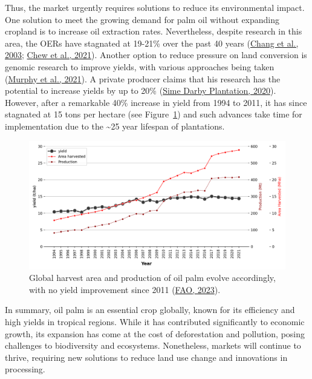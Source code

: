 \documentclass[
  letterpaper,
  DIV=11,
  numbers=noendperiod]{scrreprt}
\begin{document}
Thus, the market urgently requires solutions to reduce its environmental
impact. One solution to meet the growing demand for palm oil without
expanding cropland is to increase oil extraction rates. Nevertheless,
despite research in this area, the OERs have stagnated at 19-21\% over
the past 40 years
(\protect\hyperlink{ref-changEconomicPerspectiveOil2003}{Chang et al.,
2003}; \protect\hyperlink{ref-chewImprovingSustainabilityPalm2021}{Chew
et al., 2021}). Another option to reduce pressure on land conversion is
genomic research to improve yields, with various approaches being taken
(\protect\hyperlink{ref-murphyOilPalm2020s2021}{Murphy et al., 2021}). A
private producer claims that his research has the potential to increase
yields by up to 20\%
(\protect\hyperlink{ref-simedarbyplantationSimeDarbyPlantation2020}{Sime
Darby Plantation, 2020}). However, after a remarkable 40\% increase in
yield from 1994 to 2011, it has since stagnated at 15 tons per hectare
(see Figure~\ref{fig-op_yield}) and such advances take time for
implementation due to the \textasciitilde25 year lifespan of
plantations.

\begin{figure}

{\centering \includegraphics{text/04_literature_review_files/op_yield.png}

}

\caption{\label{fig-op_yield}Global harvest area and production of oil
palm evolve accordingly, with no yield improvement since 2011
(\protect\hyperlink{ref-faoFAOSTATDatabase2023}{FAO, 2023}).}

\end{figure}

In summary, oil palm is an essential crop globally, known for its
efficiency and high yields in tropical regions. While it has contributed
significantly to economic growth, its expansion has come at the cost of
deforestation and pollution, posing challenges to biodiversity and
ecosystems. Nonetheless, markets will continue to thrive, requiring new
solutions to reduce land use change and innovations in processing.
\end{document}
